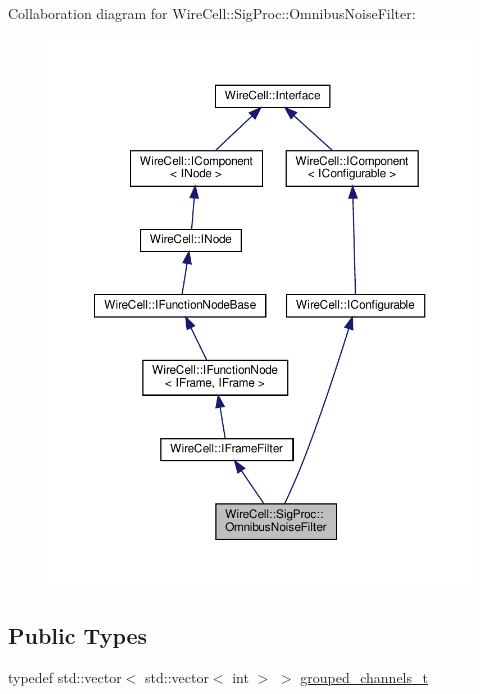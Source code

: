 Collaboration diagram for Wire\+Cell\+:\+:Sig\+Proc\+:\+:Omnibus\+Noise\+Filter\+:
\nopagebreak
\begin{figure}[H]
\begin{center}
\leavevmode
\includegraphics[width=350pt]{class_wire_cell_1_1_sig_proc_1_1_omnibus_noise_filter__coll__graph}
\end{center}
\end{figure}
\subsection*{Public Types}
\begin{DoxyCompactItemize}
\item 
typedef std\+::vector$<$ std\+::vector$<$ int $>$ $>$ \hyperlink{class_wire_cell_1_1_sig_proc_1_1_omnibus_noise_filter_a9f1abbd77ac8a8b21fcc71a9578d650e}{grouped\+\_\+channels\+\_\+t}
\end{DoxyCompactItemize}
